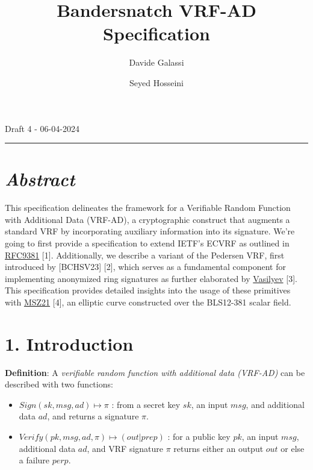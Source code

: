 \documentclass[
]{article}
\title{Bandersnatch VRF-AD Specification}
\author{Davide Galassi \and Seyed Hosseini}
\date{}
\providecommand{\tightlist}{%
  \setlength{\itemsep}{0pt}\setlength{\parskip}{0pt}}
\begin{document}
\maketitle

Draft 4 - 06-04-2024

\newcommand{\G}{\langle G \rangle}
\newcommand{\F}{\mathbb{Z}^*_r}

\begin{center}\rule{0.5\linewidth}{0.5pt}\end{center}

\hypertarget{abstract}{%
\section{\texorpdfstring{\emph{Abstract}}{Abstract}}\label{abstract}}

This specification delineates the framework for a Verifiable Random
Function with Additional Data (VRF-AD), a cryptographic construct that
augments a standard VRF by incorporating auxiliary information into its
signature. We're going to first provide a specification to extend IETF's
ECVRF as outlined in
\href{https://datatracker.ietf.org/doc/rfc9381}{RFC9381} {[}1{]}.
Additionally, we describe a variant of the Pedersen VRF, first
introduced by {[}BCHSV23{]} {[}2{]}, which serves as a fundamental
component for implementing anonymized ring signatures as further
elaborated by \href{https://hackmd.io/ulW5nFFpTwClHsD0kusJAA}{Vasilyev}
{[}3{]}. This specification provides detailed insights into the usage of
these primitives with \href{https://eprint.iacr.org/2021/1152}{MSZ21}
{[}4{]}, an elliptic curve constructed over the BLS12-381 scalar field.

\hypertarget{introduction}{%
\section{1. Introduction}\label{introduction}}

\textbf{Definition}: A \emph{verifiable random function with additional
data (VRF-AD)} can be described with two functions:

\begin{itemize}
\tightlist
\item
  \(Sign(sk,msg,ad) \mapsto \pi\) : from a secret key \(sk\), an input
  \(msg\), and additional data \(ad\), and returns a signature \(\pi\).
\item
  \(Verify(pk,msg,ad,\pi) \mapsto (out|prep)\) : for a public key
  \(pk\), an input \(msg\), additional data \(ad\), and VRF signature
  \(\pi\) returns either an output \(out\) or else a failure \(perp\).
\end{itemize}
\end{document}
